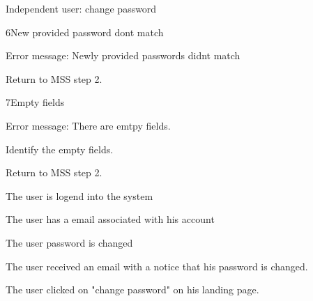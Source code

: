 \begin{uc}{Independent user: change password}
\begin{uc-ext}
        \begin{uc-fail}{6}{New provided password dont match}
        \item Error message: Newly provided passwords didnt match
        \item Return to MSS step 2.
        \end{uc-fail}

        \begin{uc-fail}{7}{Empty fields}
        \item Error message: There are emtpy fields.
        \item Identify the empty fields.
        \item Return to MSS step 2.
        \end{uc-fail}

    \end{uc-ext}

    \begin{uc-pre}
    \item The user is logend into the system
    \item The user has a email associated with his account
    \end{uc-pre}

    \begin{uc-post}
    \item The user password is changed
    \item The user received an email with a notice that his password is changed.
    \end{uc-post}

    \begin{uc-trig}
        The user clicked on "change password" on his landing page.
    \end{uc-trig}

\end{uc}
